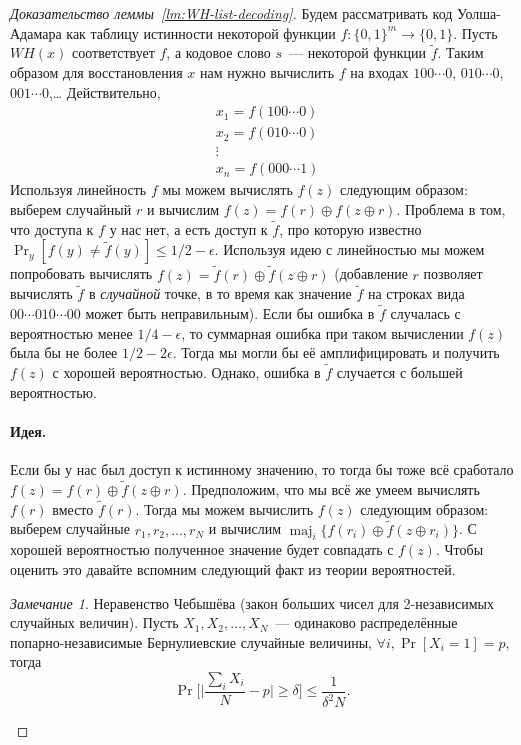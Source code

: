 \documentclass[12pt,a4paper]{article}
\newcommand{\bits}{\{0,1\}}
\DeclareMathOperator*{\maj}{maj}
\theoremstyle{definition}
\theoremstyle{plain}
\theoremstyle{remark}
\newtheorem{remark}{Замечание}[section]
\begin{document}
\begin{proof}[Доказательство леммы~\ref*{lm:WH-list-decoding}]
Будем рассматривать код Уолша-Адамара как таблицу истинности некоторой функции $f:\{0,1\}^m\to \bits$.
Пусть $WH(x)$ соответствует $f$, а кодовое слово $s$~--- некоторой функции $\tilde{f}$. Таким 
образом для восстановления $x$ нам нужно вычислить $f$ на входах $100\dotsb0$, $010\dotsb0$, $001\dotsb0$,\ldots
Действительно, 
$$
\begin{aligned}
&x_1 = f(100\dotsb0)\\
&x_2 = f(010\dotsb0)\\
&\vdots\\
&x_n = f(000\dotsb 1)
\end{aligned}
$$
Используя линейность $f$ мы можем вычислять $f(z)$ следующим образом: 
выберем случайный $r$ и вычислим $f(z) = f(r) \oplus f(z \oplus r)$. Проблема в том,
что доступа к $f$ у нас нет, а есть доступ к $\tilde{f}$, про которую известно
$\Pr_y[f(y) \neq \tilde{f}(y)]\le 1/2 - \epsilon.$
Используя идею с линейностью мы можем попробовать вычислять 
$f(z) = \tilde{f}(r) \oplus \tilde{f}(z \oplus r)$ (добавление $r$ позволяет вычислять
$\tilde{f}$ в \emph{случайной} точке, в то время как значение $\tilde{f}$
на строках вида $00\cdots010\cdots00$ может быть неправильным).
Если бы ошибка в $\tilde{f}$ случалась с вероятностью менее $1/4-\epsilon$,
то суммарная ошибка при таком вычислении $f(z)$ была бы не более $1/2 - 2\epsilon$.
Тогда мы могли бы её амплифицировать и получить $f(z)$ с хорошей вероятностью.
Однако, ошибка в $\tilde f$ случается с большей вероятностью.

\paragraph{Идея.} Если бы у нас был доступ к истинному значению, то тогда бы тоже всё сработало
$f(z) = f(r) \oplus \tilde{f}(z \oplus r)$. Предположим, 
что мы всё же умеем вычислять $f(r)$ вместо $\tilde{f}(r)$. Тогда мы можем вычислить $f(z)$ 
следующим образом: выберем случайные $r_1,r_2,\dotsc,r_N$ 
и вычислим $\maj_i\{f(r_i) \oplus \tilde{f}(z \oplus r_i)\}$.
С хорошей вероятностью полученное значение будет совпадать с $f(z)$. Чтобы оценить это давайте вспомним следующий
факт из теории вероятностей.

\begin{remark}{Неравенство Чебышёва (закон больших чисел для 2-независимых случайных величин).}
Пусть $X_1,X_2,\dotsc,X_N$~--- одинаково распределённые попарно-независимые 
Бернулиевские случайные величины, $\forall i, \Pr[X_i = 1] = p$, тогда
$$\Pr\Biggl[ \biggl|\frac{\sum_i X_i}{N} - p\biggr| \ge \delta \Biggr]\le \frac{1}{\delta^2 N}.$$
\end{remark}


\end{proof}
\end{document}

